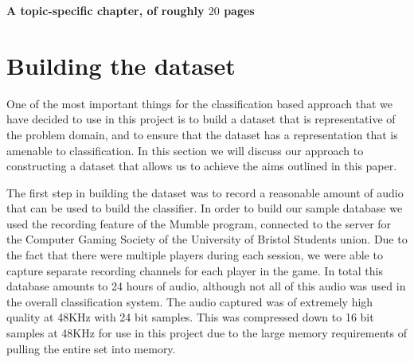 \documentclass[ %
                    author={Sam Phippen},
                supervisor={Dr. Rafal Bogacz},
                     title={Real time voice activity detectors in noisy personal computing environments},
                  subtitle={},
                    degree={MEng},
                      year={2012} ]{thesis}
\begin{document}
{\bf A topic-specific chapter, of roughly $20$ pages} 
\vspace{1cm} 

%
%
%

\section{Building the dataset}

One of the most important things for the classification based approach that we
have decided to use in this project is to build a dataset that is
representative of the problem domain, and to ensure that the dataset has a
representation that is amenable to classification. In this section we will
discuss our approach to constructing a dataset that allows us to achieve the
aims outlined in this paper.

The first step in building the dataset was to record a reasonable amount of
audio that can be used to build the classifier. In order to build our sample
database we used the recording feature of the Mumble\cite{mumble} program,
connected to the server for the Computer Gaming Society of the University of
Bristol Students union. Due to the fact that there were multiple players during
each session, we were able to capture separate recording channels for each
player in the game. In total this database amounts to 24 hours of audio,
although not all of this audio was used in the overall classification system.
The audio captured was of extremely high quality at 48KHz with 24 bit samples.
This was compressed down to 16 bit samples at 48KHz for use in this project due
to the large memory requirements of pulling the entire set into memory. 
\end{document}

